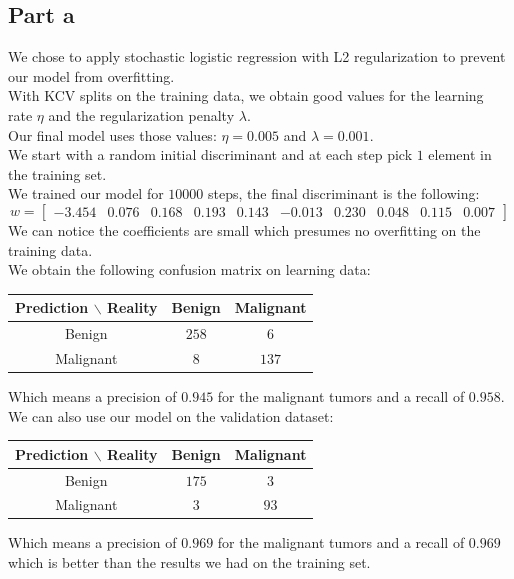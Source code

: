 \documentclass[a4paper, 10pt]{article}
\begin{document}
\subsection{Part a}
We chose to apply stochastic logistic regression with L2 regularization to prevent our model
from overfitting.
\\
With KCV splits on the training data, we obtain good values for the learning rate $\eta$ and the 
regularization penalty $\lambda$.\\
Our final model uses those values: $\eta=0.005$ and $\lambda=0.001$.
\\
We start with a random initial discriminant and at each step pick $1$ element in the training set.
\\
We trained our model for $10000$ steps, the final discriminant is the following:
$$
w=
\begin{bmatrix}
    -3.454 & 0.076 & 0.168 & 0.193 & 0.143 & -0.013 & 0.230 & 0.048 & 0.115 & 0.007
\end{bmatrix}
$$
We can notice the coefficients are small which presumes no overfitting on the training data.
\\
We obtain the following confusion matrix on learning data:
\begin{center}
    \begin{tabular}{ |c|c|c| }
        \hline
        Prediction $\backslash$ Reality & Benign & Malignant \\
        \hline
        Benign & $258$ & $6$ \\
        \hline
        Malignant & $8$ & $137$ \\ 
        \hline
    \end{tabular}
\end{center}
Which means a precision of $0.945$ for the malignant tumors and a recall of $0.958$.
\\
We can also use our model on the validation dataset:
\begin{center}
    \begin{tabular}{ |c|c|c| }
        \hline
        Prediction $\backslash$ Reality & Benign & Malignant \\
        \hline
        Benign & $175$ & $3$ \\
        \hline
        Malignant & $3$ & $93$ \\ 
        \hline
    \end{tabular}
\end{center}
Which means a precision of $0.969$ for the malignant tumors and a recall of $0.969$ which is better than 
the results we had on the training set.
\end{document}
